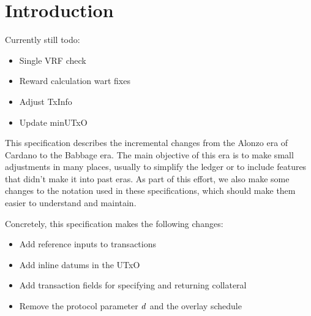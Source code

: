 \section{Introduction}

Currently still todo:

\begin{itemize}
\item Single VRF check
\item Reward calculation wart fixes
\item Adjust TxInfo
\item Update minUTxO
\end{itemize}

This specification describes the incremental changes from the Alonzo
era of Cardano to the Babbage era. The main objective of this era is
to make small adjustments in many places, usually to simplify the
ledger or to include features that didn't make it into past eras. As
part of this effort, we also make some changes to the notation used in
these specifications, which should make them easier to understand and
maintain.

Concretely, this specification makes the following changes:
\begin{itemize}
\item Add reference inputs to transactions
\item Add inline datums in the UTxO
\item Add transaction fields for specifying and returning collateral
\item Remove the protocol parameter $\mathit{d}$ and the overlay schedule
\end{itemize}
